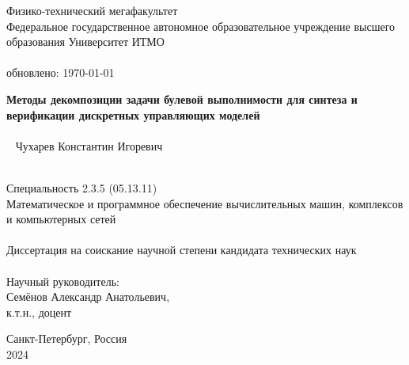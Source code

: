 \thispagestyle{empty}


\vspace{0pt plus2fill} %
\begin{center}
	Физико-технический мегафакультет \\
	Федеральное государственное автономное образовательное учреждение высшего образования Университет ИТМО \\ \ \\
	{\tiny обновлено: \today}
\end{center}

\vspace*{230pt}
\begin{center}
\textbf {\large %
Методы декомпозиции задачи булевой выполнимости для синтеза и верификации дискретных управляющих моделей
} \\ \ \\ \
{\large
Чухарев Константин Игоревич
}
\\ \

Специальность 2.3.5 (05.13.11) \\
Математическое и программное обеспечение вычислительных машин, комплексов и компьютерных сетей \\ \ \\
Диссертация на соискание научной степени кандидата технических наук \\ \ \\
Научный руководитель: \\
Семёнов Александр Анатольевич, \\
к.т.н., доцент
\end{center}

\vspace{0pt plus2fill} %

\begin{center}
	Санкт-Петербург, Россия\\
	2024
\end{center}
